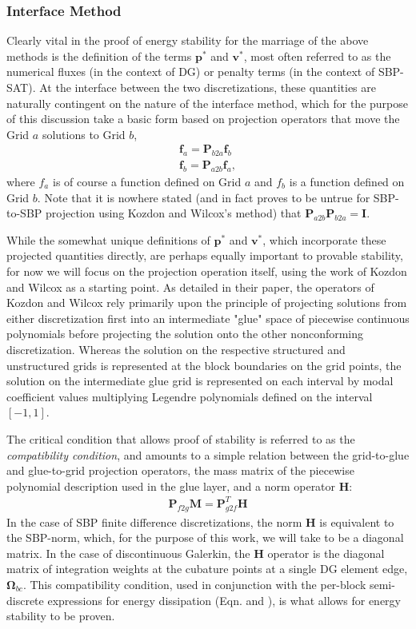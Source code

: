 \subsubsection{Interface Method} \label{sec:interface}

Clearly vital in the proof of energy stability for the marriage of the
above methods is the definition of the terms $\pmb{p}^*$ and $\pmb{v}^*$, most
often referred to as the numerical fluxes (in the context of DG) or penalty terms
(in the context of SBP-SAT). At the interface between the two discretizations, these
quantities are naturally contingent on the nature of the interface method, which
for the purpose of this discussion take a basic form based on projection operators
that move the Grid $a$ solutions to Grid $b$,
\begin{align}
\pmb{f}_{a} = \pmb{P}_{b2a}\pmb{f}_{b} \\
\pmb{f}_{b} = \pmb{P}_{a2b}\pmb{f}_{a},
\end{align}
where $f_{a}$ is of course a function defined on Grid $a$ and $f_{b}$ is a function
defined on Grid $b$. Note that it is nowhere stated (and in fact proves to be untrue
for SBP-to-SBP projection using Kozdon and Wilcox's method) that $\pmb{P}_{a2b}\pmb{P}_{b2a} = \pmb{I}$.

While the somewhat unique definitions of $\pmb{p}^{*}$ and
$\pmb{v}^{*}$, which incorporate these projected quantities directly, are perhaps
equally important to provable stability, for now we will focus on the projection
operation itself, using the work of Kozdon and Wilcox as a starting point.
As detailed in their paper, the operators of Kozdon and Wilcox rely primarily
upon the principle of projecting solutions from either discretization
first into an intermediate "glue" space of piecewise continuous polynomials
before projecting the solution onto the other nonconforming discretization. Whereas
the solution on the respective structured and unstructured grids is represented at
the block boundaries on the grid points, the solution on the intermediate glue grid
is represented on each interval by modal coefficient values multiplying Legendre
polynomials defined on the interval $[-1,1]$.

The critical condition that allows proof of stability is referred to as the
\emph{compatibility condition}, and amounts to a simple relation between the
grid-to-glue and glue-to-grid projection operators, the mass matrix of the
piecewise polynomial description used in the glue layer, and a norm operator
$\pmb{H}$:
\begin{align}
\pmb{P}_{f2g}\pmb{M} = \pmb{P}_{g2f}^{T}\pmb{H} \label{eq:compat}
\end{align}
In the case of SBP finite difference discretizations, the norm $\pmb{H}$ is equivalent
to the SBP-norm, which, for the purpose of this work, we will take to be
a diagonal matrix. In the case of discontinuous Galerkin, the $\pmb{H}$ operator is
the diagonal matrix of integration weights at the cubature points at a single
DG element edge, $\pmb{\Omega}_{bc}$.  This compatibility condition, used in conjunction with
the per-block semi-discrete expressions for energy dissipation (Eqn.  and
), is what allows for energy stability to be proven.

